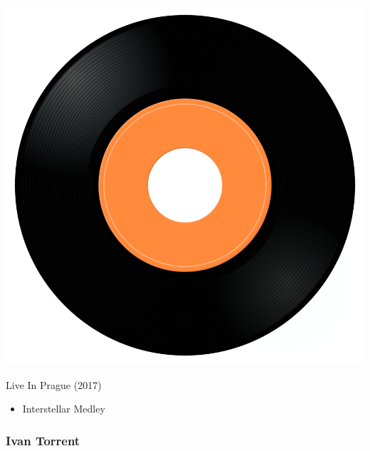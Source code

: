 \begin{minipage}[t]{0.25\textwidth}\vspace{0pt}
\captionsetup{type=figure}
\includegraphics[width=\textwidth]{Images/cover.png}
\caption*{Live In Prague (2017)}
\end{minipage}
\begin{minipage}[t]{0.25\textwidth}\vspace{0pt}
\begin{itemize}[nosep,leftmargin=1em,labelwidth=*,align=left]
	\setlength{\itemsep}{0pt}
	\item Interstellar Medley
\end{itemize}
\end{minipage}

\subsubsection{Ivan Torrent}

